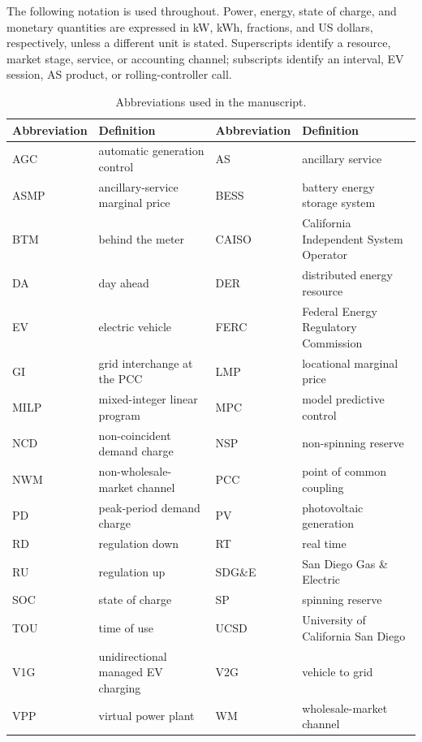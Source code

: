 \documentclass[final,5p,times]{elsarticle}
\begin{document}
The following notation is used throughout. Power, energy, state of charge, and
monetary quantities are expressed in kW, kWh, fractions, and US dollars,
respectively, unless a different unit is stated. Superscripts identify a
resource, market stage, service, or accounting channel; subscripts identify an
interval, EV session, AS product, or rolling-controller call.

\begin{table}[H]
\centering
\caption{Abbreviations used in the manuscript.}
\label{tab:abbreviations}
\scriptsize
\begin{tabularx}{\textwidth}{@{}p{}X p{}X@{}}
\toprule
Abbreviation & Definition & Abbreviation & Definition \\
\midrule
AGC & automatic generation control & AS & ancillary service \\
ASMP & ancillary-service marginal price & BESS & battery energy storage system \\
BTM & behind the meter & CAISO & California Independent System Operator \\
DA & day ahead & DER & distributed energy resource \\
EV & electric vehicle & FERC & Federal Energy Regulatory Commission \\
GI & grid interchange at the PCC & LMP & locational marginal price \\
MILP & mixed-integer linear program & MPC & model predictive control \\
NCD & non-coincident demand charge & NSP & non-spinning reserve \\
NWM & non-wholesale-market channel & PCC & point of common coupling \\
PD & peak-period demand charge & PV & photovoltaic generation \\
RD & regulation down & RT & real time \\
RU & regulation up & SDG\&E & San Diego Gas \& Electric \\
SOC & state of charge & SP & spinning reserve \\
TOU & time of use & UCSD & University of California San Diego \\
V1G & unidirectional managed EV charging & V2G & vehicle to grid \\
VPP & virtual power plant & WM & wholesale-market channel \\
\bottomrule
\end{tabularx}
\end{table}
\end{document}
